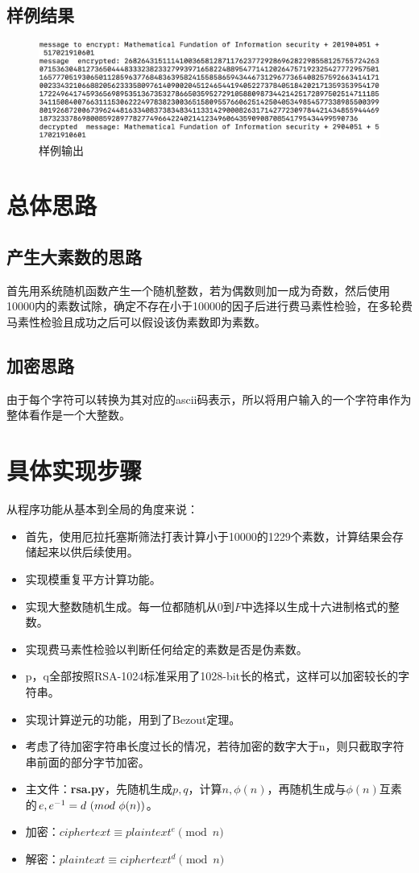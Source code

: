 \documentclass[a4paper]{article}
\begin{document}
\subsection{样例结果}
\begin{figure}[H]
    \centering
    \includegraphics[width=.8\textwidth]{sample.png}
    \caption{样例输出}
    \label{fig:sample}
\end{figure}
\section{总体思路}
\subsection{产生大素数的思路}
首先用系统随机函数产生一个随机整数，若为偶数则加一成为奇数，然后使用10000内的素数试除，确定不存在小于10000的因子后进行费马素性检验，在多轮费马素性检验且成功之后可以假设该伪素数即为素数。
\subsection{加密思路}
由于每个字符可以转换为其对应的ascii码表示，所以将用户输入的一个字符串作为整体看作是一个大整数。

\section{具体实现步骤}
从程序功能从基本到全局的角度来说：
\begin{itemize}[label=]
    \item 首先，使用厄拉托塞斯筛法打表计算小于10000的1229个素数，计算结果会存储起来以供后续使用。
    \item 实现模重复平方计算功能。
    \item 实现大整数随机生成。每一位都随机从$0$到$F$中选择以生成十六进制格式的整数。
    \item 实现费马素性检验以判断任何给定的素数是否是伪素数。
    \item p，q全部按照RSA-1024标准采用了1028-bit长的格式，这样可以加密较长的字符串。
    \item 实现计算逆元的功能，用到了Bezout定理。
    \item 考虑了待加密字符串长度过长的情况，若待加密的数字大于n，则只截取字符串前面的部分字节加密。
    \item 主文件：\textbf{rsa.py}，先随机生成$p, q$，计算$n, \phi(n)$，再随机生成与$\phi(n)$互素的$e, \\e^{-1}=d\ (mod\ \phi(n))$。
    \item 加密：$ciphertext\equiv plaintext^e\pmod n$
    \item 解密：$plaintext\equiv ciphertext^d\pmod n$
    \end{itemize}
\end{document}

